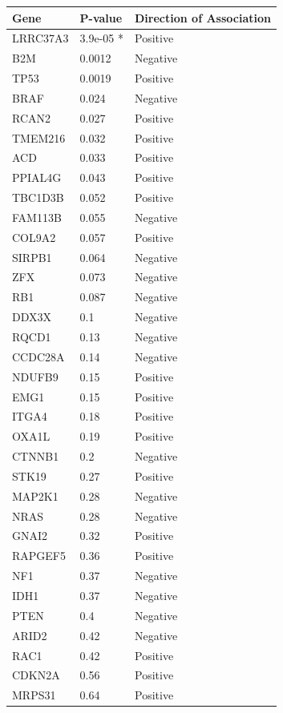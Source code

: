 \documentclass[
]{book}
\begin{document}
\begin{tabular}{l|l|l}
\hline
Gene & P-value & Direction of Association\\
\hline
LRRC37A3 & 3.9e-05 * & Positive\\
\hline
B2M & 0.0012 & Negative\\
\hline
TP53 & 0.0019 & Positive\\
\hline
BRAF & 0.024 & Negative\\
\hline
RCAN2 & 0.027 & Positive\\
\hline
TMEM216 & 0.032 & Positive\\
\hline
ACD & 0.033 & Positive\\
\hline
PPIAL4G & 0.043 & Positive\\
\hline
TBC1D3B & 0.052 & Positive\\
\hline
FAM113B & 0.055 & Negative\\
\hline
COL9A2 & 0.057 & Positive\\
\hline
SIRPB1 & 0.064 & Negative\\
\hline
ZFX & 0.073 & Negative\\
\hline
RB1 & 0.087 & Negative\\
\hline
DDX3X & 0.1 & Negative\\
\hline
RQCD1 & 0.13 & Negative\\
\hline
CCDC28A & 0.14 & Negative\\
\hline
NDUFB9 & 0.15 & Positive\\
\hline
EMG1 & 0.15 & Positive\\
\hline
ITGA4 & 0.18 & Positive\\
\hline
OXA1L & 0.19 & Positive\\
\hline
CTNNB1 & 0.2 & Negative\\
\hline
STK19 & 0.27 & Positive\\
\hline
MAP2K1 & 0.28 & Negative\\
\hline
NRAS & 0.28 & Negative\\
\hline
GNAI2 & 0.32 & Positive\\
\hline
RAPGEF5 & 0.36 & Positive\\
\hline
NF1 & 0.37 & Negative\\
\hline
IDH1 & 0.37 & Negative\\
\hline
PTEN & 0.4 & Negative\\
\hline
ARID2 & 0.42 & Negative\\
\hline
RAC1 & 0.42 & Positive\\
\hline
CDKN2A & 0.56 & Positive\\
\hline
MRPS31 & 0.64 & Positive\\

\end{tabular}
\end{document}
